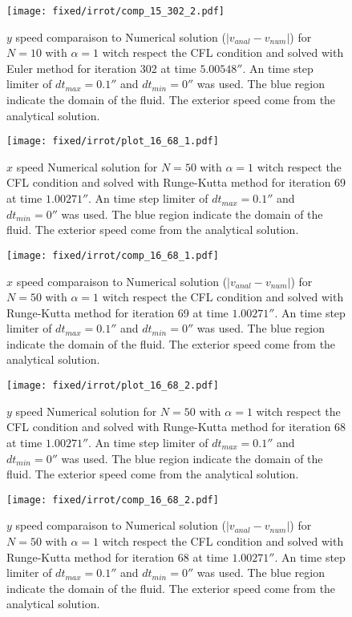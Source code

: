 \begin{figure}
\texttt{[image: fixed/irrot/comp\_15\_302\_2.pdf]}
\caption{$y$ speed comparaison to Numerical solution ($|v_{anal}-v_{num}|$) for $N=10$ with $\alpha=1$ witch respect the CFL condition and solved with Euler method
for iteration 302 at time $\unit{5.00548}{\second}$.
An time step limiter of $dt_{max}=\unit{0.1}{\second}$ and $dt_{min}=\unit{0}{\second}$ was used.
The blue region indicate the domain of the fluid. The exterior speed come from the analytical solution.
\label{fix:comp_15_302_2}
}
\end{figure}

\begin{figure}
\texttt{[image: fixed/irrot/plot\_16\_68\_1.pdf]}
\caption{$x$ speed Numerical solution for $N=50$ with $\alpha=1$ witch respect the CFL condition and solved with Runge-Kutta method
for iteration 69 at time $\unit{1.00271}{\second}$.
An time step limiter of $dt_{max}=\unit{0.1}{\second}$ and $dt_{min}=\unit{0}{\second}$ was used.
The blue region indicate the domain of the fluid. The exterior speed come from the analytical solution.
\label{fix:plot_16_68_1}
}
\end{figure}

\begin{figure}
\texttt{[image: fixed/irrot/comp\_16\_68\_1.pdf]}
\caption{$x$ speed comparaison to Numerical solution ($|v_{anal}-v_{num}|$) for $N=50$ with $\alpha=1$ witch respect the CFL condition and solved with Runge-Kutta method
for iteration 69 at time $\unit{1.00271}{\second}$.
An time step limiter of $dt_{max}=\unit{0.1}{\second}$ and $dt_{min}=\unit{0}{\second}$ was used.
The blue region indicate the domain of the fluid. The exterior speed come from the analytical solution.
\label{fix:comp_16_68_1}
}
\end{figure}

\begin{figure}
\texttt{[image: fixed/irrot/plot\_16\_68\_2.pdf]}
\caption{$y$ speed Numerical solution for $N=50$ with $\alpha=1$ witch respect the CFL condition and solved with Runge-Kutta method
for iteration 68 at time $\unit{1.00271}{\second}$.
An time step limiter of $dt_{max}=\unit{0.1}{\second}$ and $dt_{min}=\unit{0}{\second}$ was used.
The blue region indicate the domain of the fluid. The exterior speed come from the analytical solution.
\label{fix:plot_16_68_2}
}
\end{figure}

\begin{figure}
\texttt{[image: fixed/irrot/comp\_16\_68\_2.pdf]}
\caption{$y$ speed comparaison to Numerical solution ($|v_{anal}-v_{num}|$)  for $N=50$ with $\alpha=1$ witch respect the CFL condition and solved with Runge-Kutta method
for iteration 68 at time $\unit{1.00271}{\second}$.
An time step limiter of $dt_{max}=\unit{0.1}{\second}$ and $dt_{min}=\unit{0}{\second}$ was used.
The blue region indicate the domain of the fluid. The exterior speed come from the analytical solution.
\label{fix:comp_16_68_2}
}
\end{figure}

